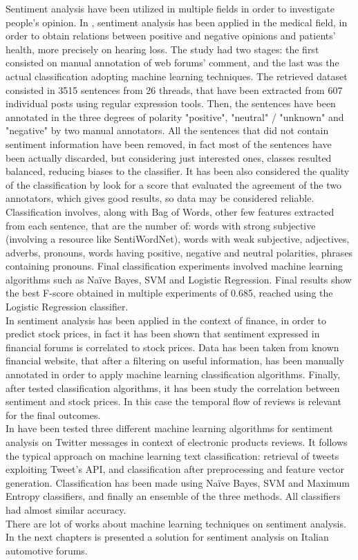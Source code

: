 Sentiment analysis have been utilized in multiple fields in order to investigate people's opinion. In \cite{ali-etal-2013-hear}, sentiment analysis has been applied in the medical field, in order to obtain relations between positive and negative opinions and patients' health, more precisely on hearing loss. The study had two stages: the first consisted on manual annotation of web forums' comment, and the last was the actual classification adopting machine learning techniques. The retrieved dataset consisted in 3515 sentences from 26 threads, that have been extracted from 607 individual posts using regular expression tools. Then, the sentences have been annotated in the three degrees of polarity "positive", "neutral" / "unknown" and "negative" by two manual annotators. All the sentences that did not contain sentiment information have been removed, in fact most of the sentences have been actually discarded, but considering just interested ones, classes resulted balanced, reducing biases to the classifier. It has been also considered the quality of the classification by look for a score that evaluated the agreement of the two annotators, which gives good results, so data may be considered reliable. Classification involves, along with Bag of Words, other few features extracted from each sentence, that are the number of: words with strong subjective (involving a resource like SentiWordNet), words with weak subjective, adjectives, adverbs, pronouns, words having positive, negative and neutral polarities, phrases containing pronouns. Final classification experiments involved machine learning algorithms such as Na{\"i}ve Bayes, \ac{SVM} and Logistic Regression. Final results show the best F-score obtained in multiple experiments of 0.685, reached using the Logistic Regression classifier.\\
In \cite{6705664} sentiment analysis has been applied in the context of finance, in order to predict stock prices, in fact it has been shown that sentiment expressed in financial forums is correlated to stock prices. Data has been taken from known financial website, that after a filtering on useful information, has been manually annotated in order to apply machine learning classification algorithms. Finally, after tested classification algorithms, it has been study the correlation between sentiment and stock prices. In this case the temporal flow of reviews is relevant for the final outcomes.\\
In \cite{6726818} have been tested three different machine learning algorithms for sentiment analysis on Twitter messages in context of electronic products reviews. It follows the typical approach on machine learning text classification: retrieval of tweets exploiting Tweet's API, and classification after preprocessing and feature vector generation. Classification has been made using Na{\"i}ve Bayes, \ac{SVM} and Maximum Entropy classifiers, and finally an ensemble of the three methods. All classifiers had almost similar accuracy.\\
There are lot of works about machine learning techniques on sentiment analysis. In the next chapters is presented a solution for sentiment analysis on Italian automotive forums.









